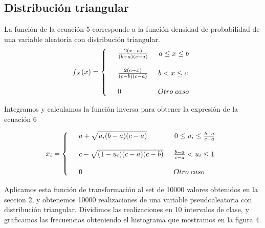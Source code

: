 \documentclass[10pt,journal,compsoc]{IEEEtran}
\begin{document}
\subsection{Distribuci\'on triangular}
La funci\'on de la ecuaci\'on 5 corresponde a la funci\'on densidad de probabilidad de una variable aleatoria con distribuci\'on triangular.
\begin{align}
   f_{X}(x) = \left\{
  \begin{array}{rl}
	&\frac{2(x-a)}{(b-a)(c-a)} \hspace{0.5cm} a \le x \le b\\\\
	&\frac{2(c-x)}{(c-b)(c-a)} \hspace{0.5cm} b < x \le c\\\\
	&0 \hspace{1.8 cm} Otro \hspace{0.1cm} caso
  \end{array} \right.
\end{align}


Integramos y calculamos la funci\'on inversa para obtener la expresi\'on de la ecuaci\'on 6

\begin{align}
 x_i = \left\{
  \begin{array}{rl}
	&a+\sqrt{u_i(b-a)(c-a)} \hspace{1.35cm} 0 \le u_i \le \frac{b-a}{c-a}\\\\
	&c-\sqrt{(1-u_i)(c-a)(c-b)} \hspace{0.5cm} \frac{b-a}{c-a} < u_i \le 1\\\\
	&0 \hspace{4.5 cm} Otro \hspace{0.1cm} caso
  \end{array} \right.
\end{align}

Aplicamos esta funci\'on de transformaci\'on al set de 10000 valores obtenidos en la seccion 2, y obtenemos
10000 realizaciones de una variable pseudoaleatoria con distribuci\'on triangular.  Dividimos las realizaciones
en 10 intervalos de clase, y graficamos las frecuencias obteniendo el histograma que mostramos en la figura 4.
\end{document}
